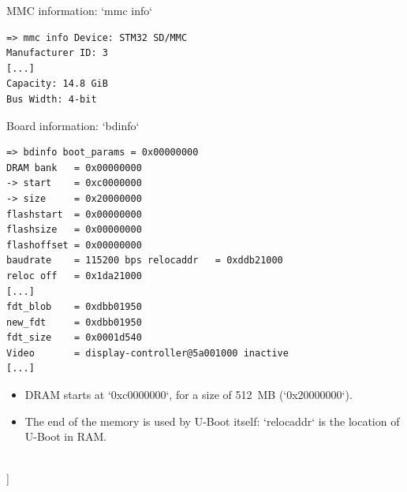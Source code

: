     \begin{block}{MMC information: `mmc info`}
      {\tiny
\begin{verbatim}
=> mmc info Device: STM32 SD/MMC
Manufacturer ID: 3
[...]
Capacity: 14.8 GiB
Bus Width: 4-bit
\end{verbatim}
      }
    \end{block}


    \begin{block}{Board information: `bdinfo`}
      {\tiny
\begin{verbatim}
=> bdinfo boot_params = 0x00000000
DRAM bank   = 0x00000000
-> start    = 0xc0000000
-> size     = 0x20000000
flashstart  = 0x00000000
flashsize   = 0x00000000
flashoffset = 0x00000000
baudrate    = 115200 bps relocaddr   = 0xddb21000
reloc off   = 0x1da21000
[...]
fdt_blob    = 0xdbb01950
new_fdt     = 0xdbb01950
fdt_size    = 0x0001d540
Video       = display-controller@5a001000 inactive
[...]
\end{verbatim}
      }
    \end{block}

    {\scriptsize
      \begin{itemize}
      \item DRAM starts at `0xc0000000`, for a size of 512~MB
        (`0x20000000`).
      \item The end of the memory is used by U-Boot itself:
        `relocaddr` is the location of U-Boot in RAM.
      \end{itemize}
    }
  \\]


